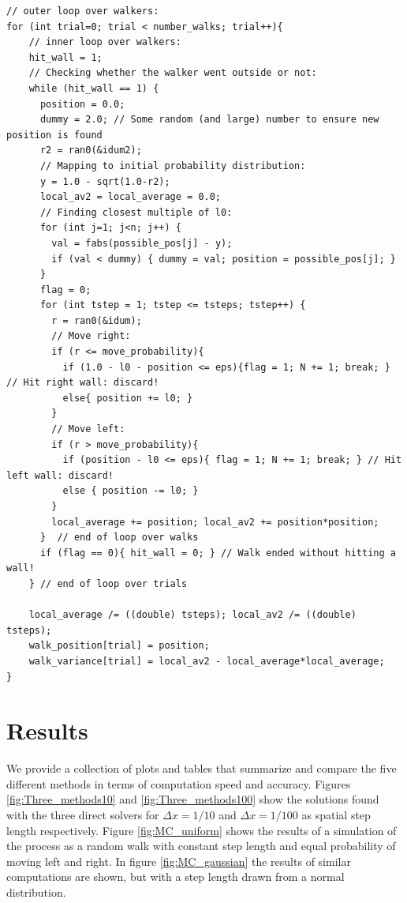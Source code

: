 \documentclass[a4paper, 11pt, notitlepage,english]{article}
\begin{document}
\begin{center}
\begin{lstlisting}
// outer loop over walkers:
for (int trial=0; trial < number_walks; trial++){
    // inner loop over walkers:
    hit_wall = 1;
    // Checking whether the walker went outside or not:
    while (hit_wall == 1) {
      position = 0.0;
      dummy = 2.0; // Some random (and large) number to ensure new position is found
      r2 = ran0(&idum2);
      // Mapping to initial probability distribution:
      y = 1.0 - sqrt(1.0-r2);
      local_av2 = local_average = 0.0;
      // Finding closest multiple of l0:
      for (int j=1; j<n; j++) {
        val = fabs(possible_pos[j] - y);
        if (val < dummy) { dummy = val; position = possible_pos[j]; }
      }
      flag = 0;
      for (int tstep = 1; tstep <= tsteps; tstep++) {
        r = ran0(&idum);
        // Move right:
        if (r <= move_probability){
          if (1.0 - l0 - position <= eps){flag = 1; N += 1; break; } // Hit right wall: discard!
          else{ position += l0; }
        }
        // Move left:
        if (r > move_probability){
          if (position - l0 <= eps){ flag = 1; N += 1; break; } // Hit left wall: discard!
          else { position -= l0; }
        }
        local_average += position; local_av2 += position*position;
      }  // end of loop over walks
      if (flag == 0){ hit_wall = 0; } // Walk ended without hitting a wall!
    } // end of loop over trials

    local_average /= ((double) tsteps); local_av2 /= ((double) tsteps);
    walk_position[trial] = position;
    walk_variance[trial] = local_av2 - local_average*local_average;
}
\end{lstlisting}
\end{center}

\section{Results}
We provide a collection of plots and tables that summarize and compare the five different methods in terms of computation speed and accuracy. Figures \ref{fig:Three_methods10} and \ref{fig:Three_methods100} show the solutions found with the three direct solvers for $\Delta x = 1/10$ and $\Delta x = 1/100$ as spatial step length respectively. Figure \ref{fig:MC_uniform} shows the results of a simulation of the process as a random walk with constant step length and equal probability of moving left and right. In figure \ref{fig:MC_gaussian} the results of similar computations are shown, but with a step length drawn from a normal distribution.
\end{document}
